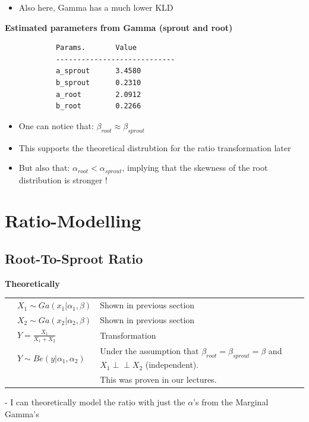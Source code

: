 \documentclass{article}
\begin{document}
			\begin{itemize}
				\item Also here, Gamma has a much lower KLD 
			\end{itemize}
		
		\textbf{Estimated parameters from Gamma (sprout and root)}
		\begin{verbatim}
			Params.       Value         
			----------------------------
			a_sprout      3.4580
			b_sprout      0.2310
			a_root        2.0912
			b_root        0.2266
		\end{verbatim}		

		\begin{itemize}
			\item One can notice that:  $\beta_{root} \approx \beta_{sprout}$
			\item This supports the theoretical distrubtion for the ratio transformation later
			\item But also that:  $\alpha_{root} < \alpha_{sprout}$, implying that the skewness of the root distribution is stronger !
		\end{itemize}
		\newpage
	
		
	\section{Ratio-Modelling}
	
		\subsection*{Root-To-Sproot Ratio}
			
			\textbf{Theoretically}
			
			\begin{tabular}{ll}
				$\quad X_1 \sim Ga(x_1| \alpha_1, \beta)$ & Shown in previous section \\
				$\quad X_2 \sim Ga(x_2| \alpha_2, \beta)$ & Shown in previous section \\
				$\quad Y = \frac{X_1}{X_1 + X_2}$ & Transformation \\
				$\quad Y \sim Be(y|\alpha_1, \alpha_2)$ & Under the assumption that $\beta_{root} = \beta_{sprout} = \beta$ and $X_1 \perp\!\!\!\perp X_2 $  (independent). \\ 
				& This was proven in our lectures.  
			\end{tabular}
			
			- I can theoretically model the ratio with just the $\alpha$'s from the Marginal Gamma's
	
\end{document}
